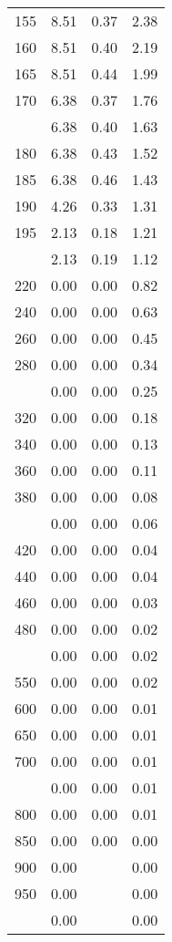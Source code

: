 \begin{table}[ht]
\begin{tabular}{lccc}
  155 & 8.51 & 0.37 & 2.38 \\ 
  160 & 8.51 & 0.40 & 2.19 \\ 
  165 & 8.51 & 0.44 & 1.99 \\ 
  170 & 6.38 & 0.37 & 1.76 \\ 
   \addlinespace
175 & 6.38 & 0.40 & 1.63 \\ 
  180 & 6.38 & 0.43 & 1.52 \\ 
  185 & 6.38 & 0.46 & 1.43 \\ 
  190 & 4.26 & 0.33 & 1.31 \\ 
  195 & 2.13 & 0.18 & 1.21 \\ 
   \addlinespace
200 & 2.13 & 0.19 & 1.12 \\ 
  220 & 0.00 & 0.00 & 0.82 \\ 
  240 & 0.00 & 0.00 & 0.63 \\ 
  260 & 0.00 & 0.00 & 0.45 \\ 
  280 & 0.00 & 0.00 & 0.34 \\ 
   \addlinespace
300 & 0.00 & 0.00 & 0.25 \\ 
  320 & 0.00 & 0.00 & 0.18 \\ 
  340 & 0.00 & 0.00 & 0.13 \\ 
  360 & 0.00 & 0.00 & 0.11 \\ 
  380 & 0.00 & 0.00 & 0.08 \\ 
   \addlinespace
400 & 0.00 & 0.00 & 0.06 \\ 
  420 & 0.00 & 0.00 & 0.04 \\ 
  440 & 0.00 & 0.00 & 0.04 \\ 
  460 & 0.00 & 0.00 & 0.03 \\ 
  480 & 0.00 & 0.00 & 0.02 \\ 
   \addlinespace
500 & 0.00 & 0.00 & 0.02 \\ 
  550 & 0.00 & 0.00 & 0.02 \\ 
  600 & 0.00 & 0.00 & 0.01 \\ 
  650 & 0.00 & 0.00 & 0.01 \\ 
  700 & 0.00 & 0.00 & 0.01 \\ 
   \addlinespace
750 & 0.00 & 0.00 & 0.01 \\ 
  800 & 0.00 & 0.00 & 0.01 \\ 
  850 & 0.00 & 0.00 & 0.00 \\ 
  900 & 0.00 &  & 0.00 \\ 
  950 & 0.00 &  & 0.00 \\ 
   \addlinespace
1000 & 0.00 &  & 0.00 \\ 
   \bottomrule
\end{tabular}
\end{table}

